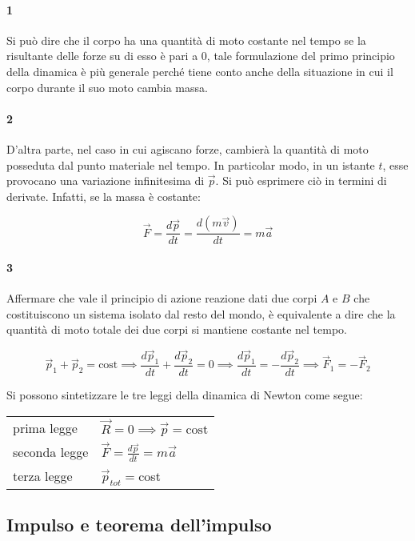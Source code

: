 \paragraph{1} Si può dire che il corpo ha una quantità di moto costante nel tempo se la risultante delle forze su di esso è pari a $0$, tale formulazione del primo principio della dinamica è più generale perché tiene conto anche della situazione in cui il corpo durante il suo moto cambia massa.

\paragraph{2} D'altra parte, nel caso in cui agiscano forze, cambierà la quantità di moto posseduta dal punto materiale nel tempo. In particolar modo, in un istante $t$, esse provocano una variazione infinitesima di $\vec{p}$. Si può esprimere ciò in termini di derivate. Infatti, se la massa è costante:

\[
	\vec{F}=\frac{d\vec{p}}{dt}=\frac{d(m\vec{v})}{dt}=m\vec{a}
\]

\paragraph{3} Affermare che vale il principio di azione reazione dati due corpi $A$ e $B$ che costituiscono un sistema isolato dal resto del mondo, è equivalente a dire che la quantità di moto totale dei due corpi si mantiene costante nel tempo.

\[
	\vec{p}_1+\vec{p}_2=\text{cost} \implies \frac{d\vec{p}_1}{dt}+\frac{d\vec{p}_2}{dt}=0 \implies \frac{d\vec{p}_1}{dt}=-\frac{d\vec{p}_2}{dt} \implies \vec{F}_1=-\vec{F}_2
\]

Si possono sintetizzare le tre leggi della dinamica di Newton come segue:

\begin{center}
	\begin{tabular}{ll}
		\toprule
		\midrule
		prima legge	  & $\vec{R}=0 \implies \vec{p} = \text{cost}$ \\
		seconda legge & $\vec{F}=\frac{d\vec{p}}{dt} = m\vec{a}$ \\
		terza legge   & $\vec{p}_{tot} = $cost \\
		\bottomrule
	\end{tabular}
\end{center}

\subsection{Impulso e teorema dell'impulso}

